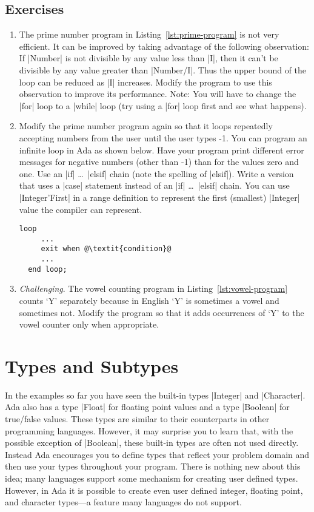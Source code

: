 \subsection*{Exercises}

\begin{enumerate}
\item The prime number program in Listing~\ref{lst:prime-program} is not very efficient. It can
  be improved by taking advantage of the following observation: If |Number| is not divisible by
  any value less than |I|, then it can't be divisible by any value greater than |Number/I|. Thus
  the upper bound of the loop can be reduced as |I| increases. Modify the program to use this
  observation to improve its performance. Note: You will have to change the |for| loop to a
  |while| loop (try using a |for| loop first and see what happens).

\item Modify the prime number program again so that it loops repeatedly accepting numbers from
  the user until the user types -1. You can program an infinite loop in Ada as shown below. Have
  your program print different error messages for negative numbers (other than -1) than for the
  values zero and one. Use an |if| \ldots\ |elsif| chain (note the spelling of |elsif|). Write a
  version that uses a |case| statement instead of an |if| \ldots\ |elsif| chain. You can use
  |Integer'First| in a range definition to represent the first (smallest) |Integer| value the
  compiler can represent.

  \begin{lstlisting}[escapechar=\@]
  loop
     ...
     exit when @\textit{condition}@
     ...
  end loop;
  \end{lstlisting}

\item \textit{Challenging}. The vowel counting program in Listing~\ref{lst:vowel-program} counts
  `Y' separately because in English `Y' is sometimes a vowel and sometimes not. Modify the
  program so that it adds occurrences of `Y' to the vowel counter only when appropriate.
\end{enumerate}

\section{Types and Subtypes}

In the examples so far you have seen the built-in types |Integer| and |Character|. Ada also has
a type |Float| for floating point values and a type |Boolean| for true/false values. These types
are similar to their counterparts in other programming languages. However, it may surprise you
to learn that, with the possible exception of |Boolean|, these built-in types are often not used
directly. Instead Ada encourages you to define types that reflect your problem domain and then
use your types throughout your program. There is nothing new about this idea; many languages
support some mechanism for creating user defined types. However, in Ada it is possible to create
even user defined integer, floating point, and character types---a feature many languages do not
support.

